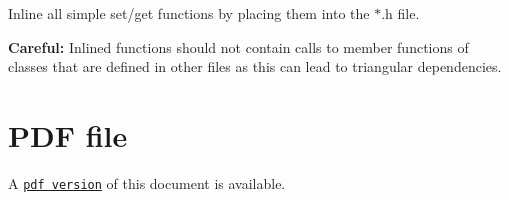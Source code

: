 \begin{DoxyItemize}
\item Inline all simple set/get functions by placing them into the $\ast$.h file.
\item {\bfseries Careful\-:} Inlined functions should not contain calls to member functions of classes that are defined in other files as this can lead to triangular dependencies.
\end{DoxyItemize}



 

 \hypertarget{index_pdf}{}\section{P\-D\-F file}\label{index_pdf}
A \href{../latex/refman.pdf}{\tt pdf version} of this document is available. 